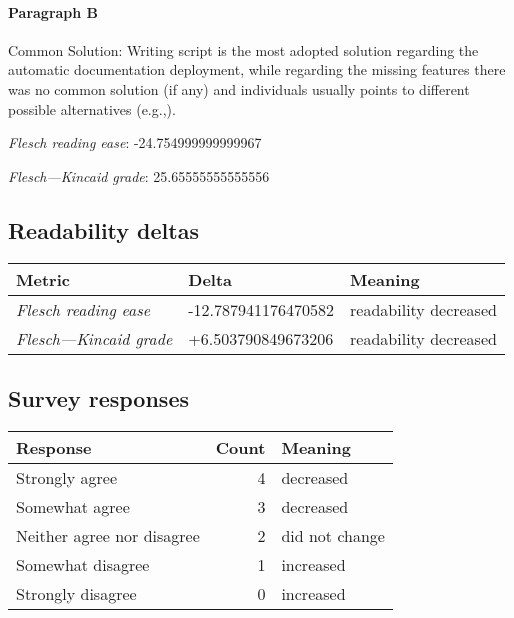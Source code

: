 \paragraph{Paragraph B}
Common Solution: Writing script is the most adopted solution regarding the automatic documentation deployment, while regarding the missing features there was no common solution (if any) and individuals usually points to different possible alternatives (e.g.,).\par\medskip\emph{Flesch reading ease}: -24.754999999999967\par\emph{Flesch---Kincaid grade}: 25.65555555555556

\subsection{Readability deltas}

\begin{tabular}{lll}
\toprule
               \textbf{Metric} &       \textbf{Delta} &       \textbf{Meaning} \\
\midrule
    \emph{Flesch reading ease} &  -12.787941176470582 &  readability decreased \\
 \emph{Flesch---Kincaid grade} &   +6.503790849673206 &  readability decreased \\
\bottomrule
\end{tabular}

\subsection{Survey responses}
\begin{tabular}{lrl}
\toprule
          \textbf{Response} &  \textbf{Count} & \textbf{Meaning} \\
\midrule
             Strongly agree &               4 &        decreased \\
             Somewhat agree &               3 &        decreased \\
 Neither agree nor disagree &               2 &   did not change \\
          Somewhat disagree &               1 &        increased \\
          Strongly disagree &               0 &        increased \\
\bottomrule
\end{tabular}

